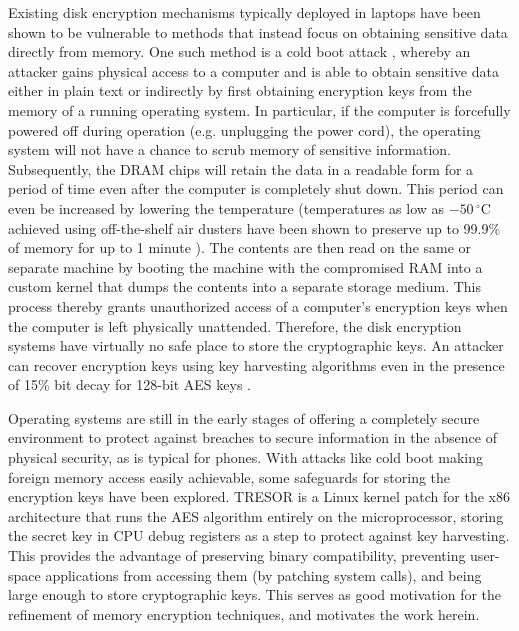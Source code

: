 \documentclass[conference,10pt]{IEEEtran}
\begin{document}
Existing disk encryption mechanisms typically deployed in laptops have been shown to be vulnerable to 
methods that instead focus on obtaining sensitive data directly from memory.  One such method is a cold 
boot attack \cite{coldboot}, whereby an attacker gains physical access to a computer and is able to obtain 
sensitive data either in plain text or indirectly by first obtaining encryption keys from the memory of a 
running operating system.  In particular, if the computer is forcefully powered off during operation (e.g. 
unplugging the power cord), the operating system will not have a chance to scrub memory of sensitive 
information.  Subsequently, the DRAM chips will retain the data in a readable form for a period of time 
even after the computer is completely shut down.  This period can even be increased by lowering the 
temperature (temperatures as low as $-50\,^{\circ}\mathrm{C}$ achieved using off-the-shelf air dusters have 
been shown to preserve up to 99.9\% of memory for up to 1 minute \cite{coldboot}).  The contents are then 
read on the same or separate machine by booting the machine with the compromised RAM into a custom kernel 
that dumps the contents into a separate storage medium.  This process thereby grants unauthorized access of 
a computer's encryption keys when the computer is left physically unattended.  Therefore, the disk 
encryption systems have virtually no safe place to store the cryptographic keys.  An attacker can 
recover encryption keys using key harvesting algorithms even in the presence of 
15\% bit decay for 128-bit AES keys \cite{coldboot}.

Operating systems are still in the early stages of offering a completely secure environment to protect 
against breaches to secure information in the absence of physical security, as is typical for phones.  With 
attacks like cold boot making foreign memory access easily achievable, some safeguards for storing the 
encryption keys have been explored.  TRESOR \cite{tresor} is a Linux kernel patch for the x86 architecture 
that runs the AES algorithm entirely on the microprocessor, storing the secret key in CPU debug registers 
as a step to protect against key harvesting.  This provides the advantage of preserving binary 
compatibility, preventing user-space applications from accessing them (by patching system calls), and being 
large enough to store cryptographic keys.  This serves as good motivation for the refinement of memory 
encryption techniques, and motivates the work herein.
\end{document}
